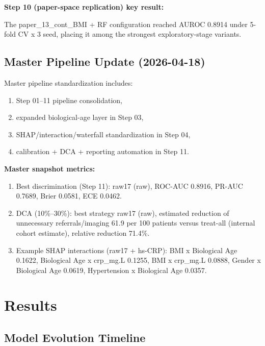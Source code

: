﻿\documentclass[11pt,a4paper]{article}
\begin{document}
\textbf{Step 10 (paper-space replication) key result:}

The paper\_13\_cont\_BMI + RF configuration reached AUROC 0.8914 under 5-fold CV x 3 seed,
placing it among the strongest exploratory-stage variants.

\subsection{Master Pipeline Update (2026-04-18)}

Master pipeline standardization includes:

\begin{enumerate}
  \item Step 01--11 pipeline consolidation,
  \item expanded biological-age layer in Step 03,
  \item SHAP/interaction/waterfall standardization in Step 04,
  \item calibration + DCA + reporting automation in Step 11.
\end{enumerate}

\textbf{Master snapshot metrics:}

\begin{enumerate}
  \item Best discrimination (Step 11): raw17 (raw), ROC-AUC 0.8916, PR-AUC 0.7689, Brier 0.0581, ECE 0.0462.
  \item DCA (10\%--30\%): best strategy raw17 (raw), estimated reduction of unnecessary referrals/imaging 61.9 per 100 patients versus treat-all (internal cohort estimate), relative reduction 71.4\%.
  \item Example SHAP interactions (raw17 + hs-CRP):
  BMI x Biological Age 0.1622,
  Biological Age x crp\_mg.L 0.1255,
  BMI x crp\_mg.L 0.0888,
  Gender x Biological Age 0.0619,
  Hypertension x Biological Age 0.0357.
\end{enumerate}

\section{Results}

\subsection{Model Evolution Timeline}
\end{document}
